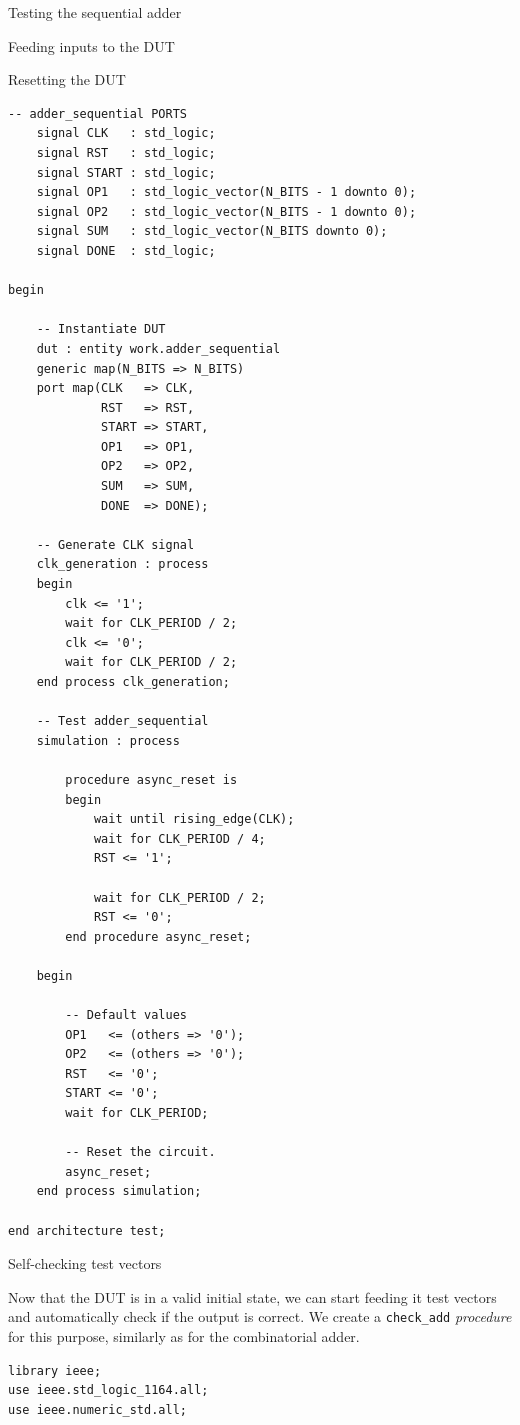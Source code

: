 \documentclass[lab]{course}
\begin{document}
\begin{section}{Testing the sequential adder}
\begin{subsection}{Feeding inputs to the DUT}
\begin{subsubsection}{Resetting the DUT}
\begin{lstlisting}[caption={Add \emph{asynchronous} reset}, captionpos=b, label={lst:sequential_process_simulation_async_reset}]
    -- adder_sequential PORTS
    signal CLK   : std_logic;
    signal RST   : std_logic;
    signal START : std_logic;
    signal OP1   : std_logic_vector(N_BITS - 1 downto 0);
    signal OP2   : std_logic_vector(N_BITS - 1 downto 0);
    signal SUM   : std_logic_vector(N_BITS downto 0);
    signal DONE  : std_logic;

begin

    -- Instantiate DUT
    dut : entity work.adder_sequential
    generic map(N_BITS => N_BITS)
    port map(CLK   => CLK,
             RST   => RST,
             START => START,
             OP1   => OP1,
             OP2   => OP2,
             SUM   => SUM,
             DONE  => DONE);

    -- Generate CLK signal
    clk_generation : process
    begin
        clk <= '1';
        wait for CLK_PERIOD / 2;
        clk <= '0';
        wait for CLK_PERIOD / 2;
    end process clk_generation;

    -- Test adder_sequential
    simulation : process

        procedure async_reset is
        begin
            wait until rising_edge(CLK);
            wait for CLK_PERIOD / 4;
            RST <= '1';

            wait for CLK_PERIOD / 2;
            RST <= '0';
        end procedure async_reset;

    begin

        -- Default values
        OP1   <= (others => '0');
        OP2   <= (others => '0');
        RST   <= '0';
        START <= '0';
        wait for CLK_PERIOD;

        -- Reset the circuit.
        async_reset;
    end process simulation;

end architecture test;
            \end{lstlisting}
        \end{subsubsection}

        \begin{subsubsection}{Self-checking test vectors}

            Now that the DUT is in a valid initial state, we can start feeding it test vectors and automatically check if the output is correct. We create a \verb+check_add+ \emph{procedure} for this purpose, similarly as for the combinatorial adder.

            \begin{lstlisting}[caption={Add test vectors}, captionpos=b, label={lst:sequential_process_simulation_test_vectors}]
library ieee;
use ieee.std_logic_1164.all;
use ieee.numeric_std.all;


\end{lstlisting}
\end{subsubsection}
\end{subsection}
\end{section}
\end{document}
